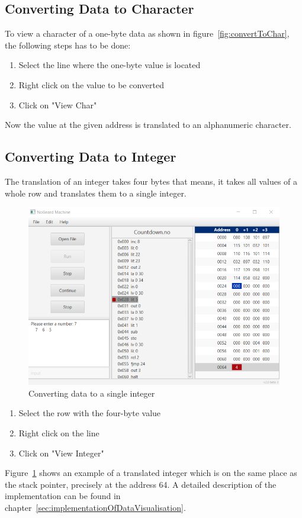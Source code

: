 \subsection{Converting Data to Character}
To view a character of a one-byte data as shown in figure~\ref{fig:convertToChar}, the following steps has to be done:
\begin{enumerate}
\item Select the line where the one-byte value is located 
\item Right click on the value to be converted
\item Click on "View Char" 
\end{enumerate}
Now the value at the given address is translated to an alphanumeric character. 
\subsection{Converting Data to Integer}
The translation of an integer takes four bytes that means, it takes all values of a whole row and translates them to a single integer.  
\begin{figure}[h] 
	\centering
	\includegraphics[scale=.85]{images/screenshot-4.png}
	\caption{Converting data to a single integer}
	\label{fig:convertToInt}
\end{figure}
\begin{enumerate}
\item Select the row with the four-byte value 
\item Right click on the line
\item Click on "View Integer" 
\end{enumerate}
Figure~\ref{fig:convertToInt} shows an example of a translated integer which is on the same place as the stack pointer, precisely at the address 64. A detailed description of the implementation can be found in chapter~\ref{sec:implementationOfDataVisualisation}.

